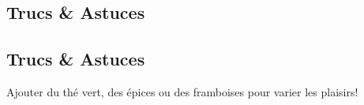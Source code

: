     \vspace{1cm}
    \hline
    \vspace{1cm}
    
    \subsection{Trucs \& Astuces}
        \subsection{Trucs \& Astuces}
	Ajouter du thé vert, des épices ou des framboises pour varier les plaisirs!
